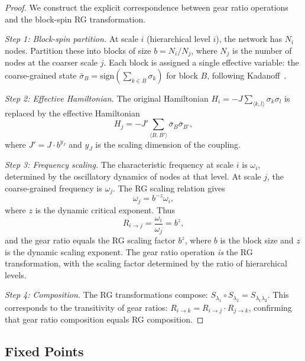 \documentclass[11pt,twocolumn,a4paper]{article}
\theoremstyle{definition}
\newcommand{\Rij}{R_{i \to j}}
\newcommand{\Rik}{R_{i \to k}}
\newcommand{\Rjk}{R_{j \to k}}
\begin{document}
\begin{proof}
We construct the explicit correspondence between gear ratio operations and the
block-spin RG transformation.

\emph{Step 1: Block-spin partition.}
At scale $i$ (hierarchical level $i$), the network has $N_i$ nodes. Partition these
into blocks of size $b = N_i/N_j$, where $N_j$ is the number of nodes at the coarser
scale $j$. Each block is assigned a single effective variable: the coarse-grained
state $\bar{\sigma}_B = \mathrm{sign}(\sum_{k \in B} \sigma_k)$ for block $B$,
following Kadanoff~\cite{kadanoff1966}.

\emph{Step 2: Effective Hamiltonian.}
The original Hamiltonian $H_i = -J \sum_{\langle k,l \rangle} \sigma_k \sigma_l$
is replaced by the effective Hamiltonian
\begin{equation}\label{eq:effective_H}
  H_j = -J' \sum_{\langle B,B' \rangle} \bar{\sigma}_B \bar{\sigma}_{B'},
\end{equation}
where $J' = J \cdot b^{y_J}$ and $y_J$ is the scaling dimension of the coupling.

\emph{Step 3: Frequency scaling.}
The characteristic frequency at scale $i$ is $\omega_i$, determined by the oscillatory
dynamics of nodes at that level. At scale $j$, the coarse-grained frequency is $\omega_j$.
The RG scaling relation gives
\begin{equation}\label{eq:rg_scaling}
  \omega_j = b^{-z} \omega_i,
\end{equation}
where $z$ is the dynamic critical exponent. Thus
\begin{equation}\label{eq:rg_gear}
  \Rij = \frac{\omega_i}{\omega_j} = b^z,
\end{equation}
and the gear ratio equals the RG scaling factor $b^z$, where $b$ is the block size and
$z$ is the dynamic scaling exponent. The gear ratio operation \emph{is} the RG
transformation, with the scaling factor determined by the ratio of hierarchical levels.

\emph{Step 4: Composition.}
The RG transformations compose: $S_{\lambda_1} \circ S_{\lambda_2} = S_{\lambda_1 \lambda_2}$.
This corresponds to the transitivity of gear ratios:
$\Rik = \Rij \cdot \Rjk$, confirming that gear ratio composition equals RG composition.
\end{proof}

\subsection{Fixed Points}\label{sec:rg:fixed}
\end{document}
